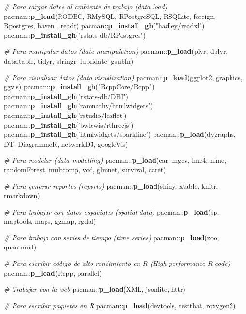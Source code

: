 \documentclass[]{article}
\newenvironment{Shaded}{\begin{snugshade}}{\end{snugshade}}
\newcommand{\KeywordTok}[1]{\textcolor[rgb]{0.13,0.29,0.53}{\textbf{{#1}}}}
\newcommand{\StringTok}[1]{\textcolor[rgb]{0.31,0.60,0.02}{{#1}}}
\newcommand{\CommentTok}[1]{\textcolor[rgb]{0.56,0.35,0.01}{\textit{{#1}}}}
\newcommand{\NormalTok}[1]{{#1}}
\begin{document}
\begin{Shaded}
\begin{Highlighting}[]
\CommentTok{# Para cargar datos al ambiente de trabajo (data load)}
\NormalTok{pacman::}\KeywordTok{p_load}\NormalTok{(RODBC, RMySQL, RPostgreSQL, RSQLite, foreign, Rpostgres, haven}
               \NormalTok{, readr)}
\NormalTok{pacman::}\KeywordTok{p_install_gh}\NormalTok{(}\StringTok{"hadley/readxl"}\NormalTok{)}
\NormalTok{pacman::}\KeywordTok{p_install_gh}\NormalTok{(}\StringTok{"rstats-db/RPostgres"}\NormalTok{)}

\CommentTok{# Para manipular datos (data manipulation)}
\NormalTok{pacman::}\KeywordTok{p_load}\NormalTok{(plyr, dplyr, data.table, tidyr, stringr, lubridate, gsubfn)}

\CommentTok{# Para visualizar datos (data visualization)}
\NormalTok{pacman::}\KeywordTok{p_load}\NormalTok{(ggplot2, graphics, ggvis)}
\NormalTok{pacman::}\KeywordTok{p_install_gh}\NormalTok{(}\StringTok{"RcppCore/Rcpp"}\NormalTok{)}
\NormalTok{pacman::}\KeywordTok{p_install_gh}\NormalTok{(}\StringTok{"rstats-db/DBI"}\NormalTok{)}
\NormalTok{pacman::}\KeywordTok{p_install_gh}\NormalTok{(}\StringTok{'ramnathv/htmlwidgets'}\NormalTok{)}
\NormalTok{pacman::}\KeywordTok{p_install_gh}\NormalTok{(}\StringTok{'rstudio/leaflet'}\NormalTok{)}
\NormalTok{pacman::}\KeywordTok{p_install_gh}\NormalTok{(}\StringTok{'bwlewis/rthreejs'}\NormalTok{)}
\NormalTok{pacman::}\KeywordTok{p_install_gh}\NormalTok{(}\StringTok{'htmlwidgets/sparkline'}\NormalTok{)}
\NormalTok{pacman::}\KeywordTok{p_load}\NormalTok{(dygraphs, DT, DiagrammeR, networkD3, googleVis)}

\CommentTok{# Para modelar (data modelling)}
\NormalTok{pacman::}\KeywordTok{p_load}\NormalTok{(car, mgcv, lme4, nlme, randomForest, multcomp, vcd, glmnet, survival, caret)}

\CommentTok{# Para generar reportes (reports)}
\NormalTok{pacman::}\KeywordTok{p_load}\NormalTok{(shiny, xtable, knitr, rmarkdown)}

\CommentTok{# Para trabajar con datos espaciales (spatial data)}
\NormalTok{pacman::}\KeywordTok{p_load}\NormalTok{(sp, maptools, maps, ggmap, rgdal)}

\CommentTok{# Para trabajo con series de tiempo (time series)}
\NormalTok{pacman::}\KeywordTok{p_load}\NormalTok{(zoo, quantmod)}

\CommentTok{# Para escribir código de alto rendimiento en R (High performance R code)}
\NormalTok{pacman::}\KeywordTok{p_load}\NormalTok{(Rcpp, parallel)}

\CommentTok{# Trabajar con la web }
\NormalTok{pacman::}\KeywordTok{p_load}\NormalTok{(XML, jsonlite, httr)}

\CommentTok{# Para escribir paquetes en R}
\NormalTok{pacman::}\KeywordTok{p_load}\NormalTok{(devtools, testthat, roxygen2)}
\end{Highlighting}
\end{Shaded}
\end{document}
